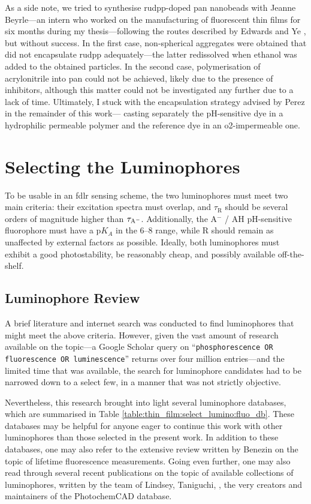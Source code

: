As a side note, we tried to synthesise \gls{rudpp}-doped \gls{pan} nanobeads with Jeanne Beyrle---an intern who worked on the manufacturing of fluorescent thin films for six months during my thesis---following the routes described by Edwards\cite[Chap.~2]{edwards2011_phd} and Ye \etal{}\cite{ye2012}, but without success. In the first case, non-spherical aggregates were obtained that did not encapsulate \gls{rudpp} adequately---the latter redissolved when ethanol was added to the obtained particles. In the second case, polymerisation of acrylonitrile into \gls{pan} could not be achieved, likely due to the presence of inhibitors, although this matter could not be investigated any further due to a lack of time. Ultimately, I stuck with the encapsulation strategy advised by Perez \etal{} in the remainder of this work---\ie{} casting separately the pH-sensitive dye in a hydrophilic permeable polymer and the reference dye in an \gls{o2}-impermeable one.

\section{Selecting the Luminophores}\label{sect:thin_film:select_lumino}

To be usable in an \gls{fdlr} sensing scheme, the two luminophores must meet two main criteria: their excitation spectra must overlap, and $\tau_\mathrm{R}$ should be several orders of magnitude higher than $\tau_\mathrm{A^{\smash{-}}}$. Additionally, the A$^-$ / AH pH-sensitive fluorophore must have a p$K_A$ in the 6--8 range, while R should remain as unaffected by external factors as possible. Ideally, both luminophores must exhibit a good photostability, be reasonably cheap, and possibly available off-the-shelf.

\subsection{Luminophore Review}

A brief literature and internet search was conducted to find luminophores that might meet the above criteria. However, given the vast amount of research available on the topic---a Google Scholar query on \enquote{\texttt{phosphorescence OR fluorescence OR luminescence}} returns over four million entries---and the limited time that was available, the search for luminophore candidates had to be narrowed down to a select few, in a manner that was not strictly objective.

Nevertheless, this research brought into light several luminophore databases, which are summarised in Table \ref{table:thin_film:select_lumino:fluo_db}. These databases may be helpful for anyone eager to continue this work with other luminophores than those selected in the present work. In addition to these databases, one may also refer to the extensive review written by Benezin \etal{}\cite{berezin2010} on the topic of lifetime fluorescence measurements. Going even further, one may also read through several recent publications on the topic of available collections of luminophores, written by the team of Lindsey, Taniguchi, \etal{}\cite{taniguchi2018a, taniguchi2018b}, the very creators and maintainers of the PhotochemCAD database.


